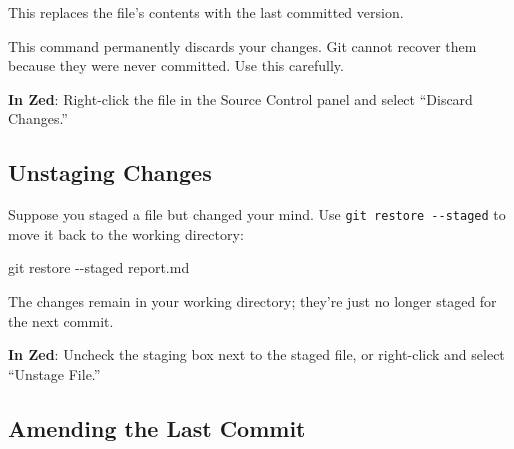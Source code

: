 \documentclass[
  letterpaper,
  DIV=11,
  numbers=noendperiod]{scrreprt}
\newenvironment{Shaded}{\begin{snugshade}}{\end{snugshade}}
\newcommand{\AttributeTok}[1]{\textcolor[rgb]{0.40,0.45,0.13}{#1}}
\newcommand{\FunctionTok}[1]{\textcolor[rgb]{0.28,0.35,0.67}{#1}}
\newcommand{\NormalTok}[1]{\textcolor[rgb]{0.00,0.23,0.31}{#1}}
\begin{document}
This replaces the file's contents with the last committed version.

\begin{tcolorbox}[enhanced jigsaw, opacitybacktitle=0.6, arc=.35mm, colback=white, bottomtitle=1mm, opacityback=0, toprule=.15mm, left=2mm, colbacktitle=quarto-callout-warning-color!10!white, breakable, coltitle=black, toptitle=1mm, colframe=quarto-callout-warning-color-frame, bottomrule=.15mm, titlerule=0mm, title=\textcolor{quarto-callout-warning-color}{\faExclamationTriangle}\hspace{0.5em}{Warning}, rightrule=.15mm, leftrule=.75mm]

This command permanently discards your changes. Git cannot recover them
because they were never committed. Use this carefully.

\end{tcolorbox}

\textbf{In Zed}: Right-click the file in the Source Control panel and
select ``Discard Changes.''

\subsection{Unstaging Changes}\label{unstaging-changes}

Suppose you staged a file but changed your mind. Use
\texttt{git\ restore\ -\/-staged} to move it back to the working
directory:

\begin{codelisting}

\caption{\texttt{terminal}}

\begin{Shaded}
\begin{Highlighting}[]
\FunctionTok{git}\NormalTok{ restore }\AttributeTok{{-}{-}staged}\NormalTok{ report.md}
\end{Highlighting}
\end{Shaded}

\end{codelisting}

The changes remain in your working directory; they're just no longer
staged for the next commit.

\textbf{In Zed}: Uncheck the staging box next to the staged file, or
right-click and select ``Unstage File.''

\subsection{Amending the Last Commit}\label{amending-the-last-commit}
\end{document}
